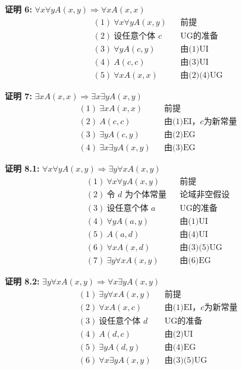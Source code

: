 \documentclass[lang=cn,11pt]{elegantbook}
\begin{document}
\noindent
\textbf{证明 6:} $\forall x\forall yA(x,y)\Rightarrow \forall xA(x,x)$
\vspace{-10pt}
\begin{align*}
&(1)\ \forall x\forall yA(x,y) && \text{前提} \\
&(2)\ \text{设任意个体 $c$} && \text{UG的准备} \\
&(3)\ \forall yA(c,y) && \text{由(1)UI} \\
&(4)\ A(c,c) && \text{由(3)UI} \\
&(5)\ \forall xA(x,x) && \text{由(2)(4)UG}
\end{align*}

\noindent
\textbf{证明 7:} $\exists xA(x,x)\Rightarrow \exists x\exists yA(x,y)$
\vspace{-10pt}
\begin{align*}
&(1)\ \exists xA(x,x) && \text{前提} \\
&(2)\ A(c,c) && \text{由(1)EI，$c$为新常量} \\
&(3)\ \exists yA(c,y) && \text{由(2)EG} \\
&(4)\ \exists x\exists yA(x,y) && \text{由(3)EG}
\end{align*}

\noindent
\textbf{证明 8.1:} $\forall x\forall yA(x,y)\Rightarrow \exists y\forall xA(x,y)$
\vspace{-10pt}
\begin{align*}
&(1)\ \forall x\forall yA(x,y) && \text{前提} \\
&(2)\ \text{令 $d$ 为个体常量} && \text{论域非空假设} \\
&(3)\ \text{设任意个体 $a$} && \text{UG的准备} \\
&(4)\ \forall yA(a,y) && \text{由(1)UI} \\
&(5)\ A(a,d) && \text{由(4)UI} \\
&(6)\ \forall xA(x,d) && \text{由(3)(5)UG} \\
&(7)\ \exists y\forall xA(x,y) && \text{由(6)EG}
\end{align*}

\noindent
\textbf{证明 8.2:} $\exists y\forall xA(x,y)\Rightarrow \forall x\exists yA(x,y)$
\vspace{-10pt}
\begin{align*}
&(1)\ \exists y\forall xA(x,y) && \text{前提} \\
&(2)\ \forall xA(x,c) && \text{由(1)EI，$c$为新常量} \\
&(3)\ \text{设任意个体 $d$} && \text{UG的准备} \\
&(4)\ A(d,c) && \text{由(2)UI} \\
&(5)\ \exists yA(d,y) && \text{由(4)EG} \\
&(6)\ \forall x\exists yA(x,y) && \text{由(3)(5)UG}
\end{align*}
\end{document}
